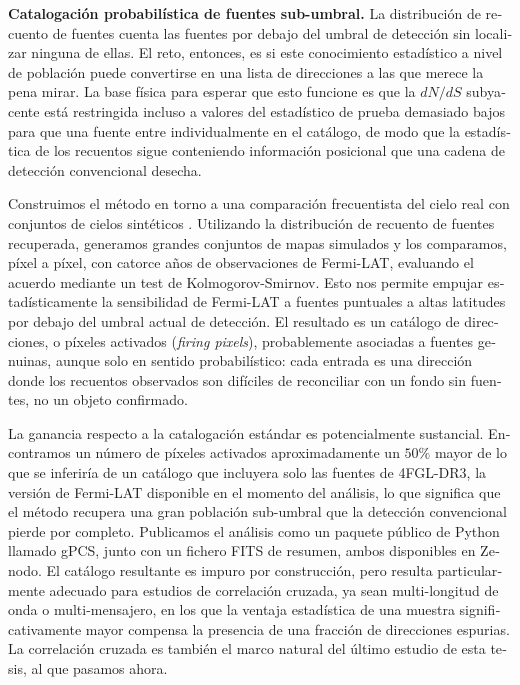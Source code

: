 \begin{otherlanguage}{spanish}
\textbf{Catalogación probabilística de fuentes sub-umbral.} La distribución de recuento de fuentes cuenta las fuentes por debajo del umbral de detección sin localizar ninguna de ellas. El reto, entonces, es si este conocimiento estadístico a nivel de población puede convertirse en una lista de direcciones a las que merece la pena mirar. La base física para esperar que esto funcione es que la $dN/dS$ subyacente está restringida incluso a valores del estadístico de prueba demasiado bajos para que una fuente entre individualmente en el catálogo, de modo que la estadística de los recuentos sigue conteniendo información posicional que una cadena de detección convencional desecha.

Construimos el método en torno a una comparación frecuentista del cielo real con conjuntos de cielos sintéticos \cite{Amerio:2023rjn}. Utilizando la distribución de recuento de fuentes recuperada, generamos grandes conjuntos de mapas simulados y los comparamos, píxel a píxel, con catorce años de observaciones de Fermi-LAT, evaluando el acuerdo mediante un test de Kolmogorov-Smirnov. Esto nos permite empujar estadísticamente la sensibilidad de Fermi-LAT a fuentes puntuales a altas latitudes por debajo del umbral actual de detección. El resultado es un catálogo de direcciones, o píxeles activados (\emph{firing pixels}), probablemente asociadas a fuentes genuinas, aunque solo en sentido probabilístico: cada entrada es una dirección donde los recuentos observados son difíciles de reconciliar con un fondo sin fuentes, no un objeto confirmado.

La ganancia respecto a la catalogación estándar es potencialmente sustancial. Encontramos un número de píxeles activados aproximadamente un $50\%$ mayor de lo que se inferiría de un catálogo que incluyera solo las fuentes de 4FGL-DR3, la versión de Fermi-LAT disponible en el momento del análisis, lo que significa que el método recupera una gran población sub-umbral que la detección convencional pierde por completo. Publicamos el análisis como un paquete público de Python llamado gPCS, junto con un fichero FITS de resumen, ambos disponibles en Zenodo. El catálogo resultante es impuro por construcción, pero resulta particularmente adecuado para estudios de correlación cruzada, ya sean multi-longitud de onda o multi-mensajero, en los que la ventaja estadística de una muestra significativamente mayor compensa la presencia de una fracción de direcciones espurias. La correlación cruzada es también el marco natural del último estudio de esta tesis, al que pasamos ahora.


\end{otherlanguage}
